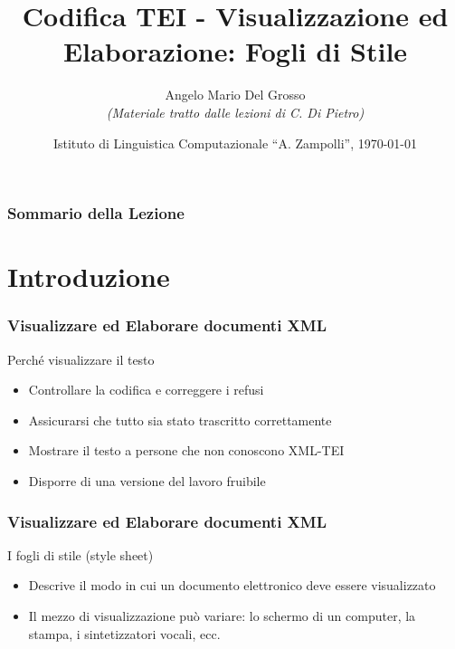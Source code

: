 \documentclass{beamer}
\title{Codifica TEI - Visualizzazione ed Elaborazione: Fogli di Stile}
\author[A.M. Del Grosso]{Angelo Mario Del Grosso \\ \tiny\textit{(Materiale tratto dalle lezioni di C. Di Pietro)}}
\institute{\texttt{angelo.delgrosso@ilc.cnr.it} \\\textit{CNR-ILC-LicoLab} \\\url{http://licolab.ilc.cnr.it/}}
\date{Istituto di Linguistica Computazionale ``A. Zampolli'', \today}
\begin{document}
    
    \begin{frame}
        \maketitle
    \end{frame}
    
    \begin{frame}
        \frametitle{Sommario della Lezione}
        \tableofcontents
    \end{frame}
    
    \section{Introduzione}
    
    \begin{frame}
        \frametitle{Visualizzare ed Elaborare documenti XML}
        \addtocounter{nframe}{1}
        

         \begin{block}{Perché visualizzare il testo}
             \begin{itemize}
                \item Controllare la codifica e correggere i refusi
                \item Assicurarsi che tutto sia stato trascritto correttamente
                \item Mostrare il testo a persone che non conoscono XML-TEI
                \item Disporre di una versione del lavoro fruibile
            \end{itemize}
         \end{block}
        
    \end{frame}
    
    \begin{frame}
        \frametitle{Visualizzare ed Elaborare documenti XML}
        \addtocounter{nframe}{1}
        
        \begin{block}{I fogli di stile (style sheet)}
           \begin{itemize}
               \item Descrive il modo in cui un documento elettronico deve essere visualizzato
               \item Il mezzo di visualizzazione può variare: lo schermo di un computer, la stampa, i sintetizzatori vocali, ecc.
           \end{itemize}
        \end{block}
        
    \end{frame}
    
\end{document}
